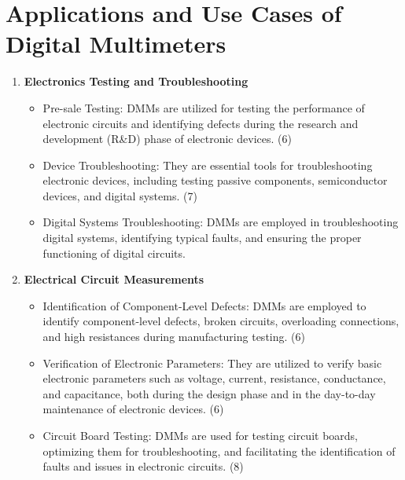 \documentclass[12pt]{article}
\begin{document}
	\section{Applications and Use Cases of Digital Multimeters}
	\begin{enumerate}
		\item \textbf{Electronics Testing and Troubleshooting}
			\begin{itemize}
				\item Pre-sale Testing: DMMs are utilized for testing the performance of electronic circuits and identifying defects during the research and development (R\&D) phase of electronic devices. (6)
				\item Device Troubleshooting: They are essential tools for troubleshooting electronic devices, including testing passive components, semiconductor devices, and digital systems. (7)
				\item Digital Systems Troubleshooting: DMMs are employed in troubleshooting digital systems, identifying typical faults, and ensuring the proper functioning of digital circuits.
			\end{itemize}
		\item \textbf{Electrical Circuit Measurements}
			\begin{itemize}
				\item Identification of Component-Level Defects: DMMs are employed to identify component-level defects, broken circuits, overloading connections, and high resistances during manufacturing testing. (6)
				\item Verification of Electronic Parameters: They are utilized to verify basic electronic parameters such as voltage, current, resistance, conductance, and capacitance, both during the design phase and in the day-to-day maintenance of electronic devices. (6)
				\item Circuit Board Testing: DMMs are used for testing circuit boards, optimizing them for troubleshooting, and facilitating the identification of faults and issues in electronic circuits. (8)
			\end{itemize}
	\end{enumerate}
	
\end{document}
